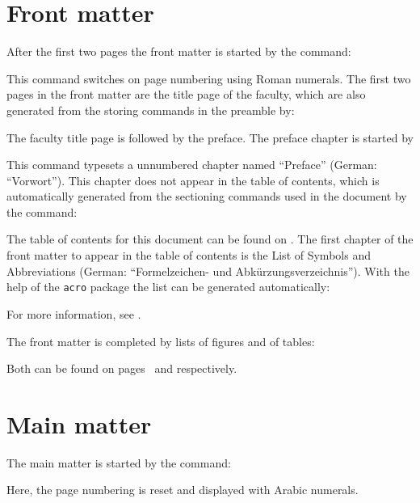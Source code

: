 \documentclass[
  paper = 17x24, %
  language = english, %
  acronym = true, %
  bibliography = true, %
  acronymline = onlyhorizontal, %
]{faupress}
\begin{document}
\section{Front matter}
After the first two pages the front matter is started by the command:
\begin{codebox}
  \frontmatter
\end{codebox}
This command switches on page numbering  using Roman numerals. The first two pages in the
front matter are the title page of the faculty, which are also generated from the storing
commands in the preamble by:
\begin{codebox}[custom]
  \makefacultytitle
\end{codebox}
\newpage
The faculty title page is followed by the preface. The preface chapter is started by
\begin{codebox}[custom]
  \begin{preface}
  \end{preface}
\end{codebox}
This command typesets a unnumbered chapter named \enquote{Preface} (German:
\enquote{Vorwort}). This chapter does not appear in the table of contents, which is
automatically generated from the sectioning commands used in the document by the command:
\begin{codebox}
  \tableofcontents
\end{codebox}
The table of contents for this document can be found on \pageref{toc}. The first chapter
of the front matter to appear in the table of contents is the List of Symbols and
Abbreviations (German: \enquote{Formelzeichen- und Abkürzungsverzeichnis}). With the help
of the \texttt{acro} package the list can be generated automatically:
\begin{codebox}[custom]
  \faupressprintacronyms
\end{codebox}
For more information, see .

The front matter is completed by lists of figures and of tables:
\begin{codebox}
  \listoffigures
  \listoftables
\end{codebox}
Both can be found on pages~\pageref{lof} and \pageref{lot} respectively.

\newpage
\section{Main matter}
The main matter is started by the command:
\begin{codebox}
  \mainmatter
\end{codebox}
Here, the page numbering is reset and displayed with Arabic numerals.
\end{document}
